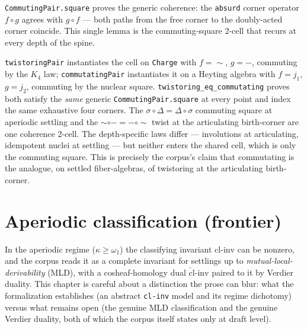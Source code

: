 \begin{theorem}\label{thm:commuting-square}\leanok{}
\texttt{CommutingPair.square} proves the generic coherence: the \texttt{absurd} corner operator $f \circ g$ agrees with $g \circ f$ --- both paths from the free corner to the doubly-acted corner coincide. This single lemma is the commuting-square 2-cell that recurs at every depth of the spine.
\end{theorem}

\begin{theorem}\label{thm:twistoring-eq-commutating}\leanok{}
\texttt{twistoringPair} instantiates the cell on \texttt{Charge} with $f = {\sim}$, $g = {-}$, commuting by the $K_4$ law; \texttt{commutatingPair} instantiates it on a Heyting algebra with $f = j_1$, $g = j_2$, commuting by the nuclear square. \texttt{twistoring\_eq\_commutating} proves both satisfy the \emph{same} generic \texttt{CommutingPair.square} at every point and index the same exhaustive four corners. The $\sigma\circ\Delta = \Delta\circ\sigma$ commuting square at aperiodic settling and the ${\sim}\circ{-} = {-}\circ{\sim}$ twist at the articulating birth-corner are one coherence 2-cell. The depth-specific laws differ --- involutions at articulating, idempotent nuclei at settling --- but neither enters the shared cell, which is only the commuting square. This is precisely the corpus's claim that commutating is the analogue, on settled fiber-algebras, of twistoring at the articulating birth-corner.
\end{theorem}

\chapter{Aperiodic classification (frontier)}\label{ch:aperiodic}

In the aperiodic regime ($\kappa \ge \omega_1$) the classifying invariant $\mathrm{cl\text{-}inv}$
can be nonzero, and the corpus reads it as a complete invariant for settlings up to
\emph{mutual-local-derivability} (MLD), with a cosheaf-homology dual $\check{\mathrm{cl}}\text{-}\mathrm{inv}$
paired to it by Verdier duality. This chapter is careful about a distinction the prose can
blur: what the formalization establishes (an abstract \texttt{cl-inv} model and its regime
dichotomy) versus what remains open (the genuine MLD classification and the genuine Verdier
duality, both of which the corpus itself states only at draft level).

